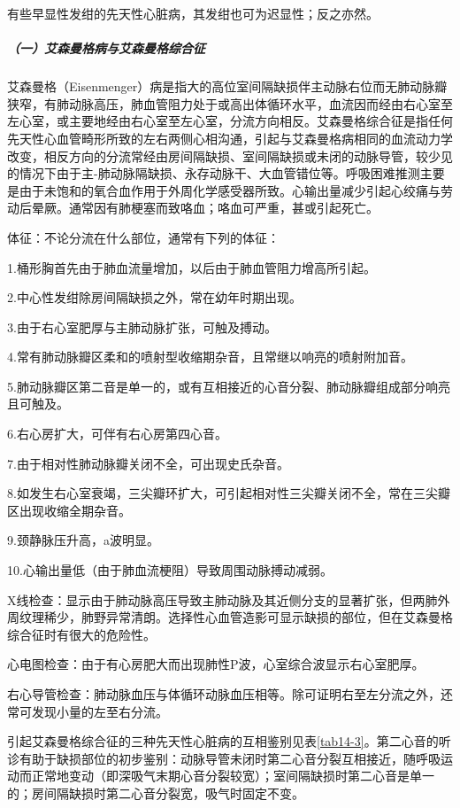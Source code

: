 有些早显性发绀的先天性心脏病，其发绀也可为迟显性；反之亦然。

\subparagraph{（一）艾森曼格病与艾森曼格综合征}

艾森曼格（Eisenmenger）病是指大的高位室间隔缺损伴主动脉右位而无肺动脉瓣狭窄，有肺动脉高压，肺血管阻力处于或高出体循环水平，血流因而经由右心室至左心室，或主要地经由右心室至左心室，分流方向相反。艾森曼格综合征是指任何先天性心血管畸形所致的左右两侧心相沟通，引起与艾森曼格病相同的血流动力学改变，相反方向的分流常经由房间隔缺损、室间隔缺损或未闭的动脉导管，较少见的情况下由于主-肺动脉隔缺损、永存动脉干、大血管错位等。呼吸困难推测主要是由于未饱和的氧合血作用于外周化学感受器所致。心输出量减少引起心绞痛与劳动后晕厥。通常因有肺梗塞而致咯血；咯血可严重，甚或引起死亡。

体征：不论分流在什么部位，通常有下列的体征：

1.桶形胸首先由于肺血流量增加，以后由于肺血管阻力增高所引起。

2.中心性发绀除房间隔缺损之外，常在幼年时期出现。

3.由于右心室肥厚与主肺动脉扩张，可触及搏动。

4.常有肺动脉瓣区柔和的喷射型收缩期杂音，且常继以响亮的喷射附加音。

5.肺动脉瓣区第二音是单一的，或有互相接近的心音分裂、肺动脉瓣组成部分响亮且可触及。

6.右心房扩大，可伴有右心房第四心音。

7.由于相对性肺动脉瓣关闭不全，可出现史氏杂音。

8.如发生右心室衰竭，三尖瓣环扩大，可引起相对性三尖瓣关闭不全，常在三尖瓣区出现收缩全期杂音。

9.颈静脉压升高，a波明显。

10.心输出量低（由于肺血流梗阻）导致周围动脉搏动减弱。

X线检查：显示由于肺动脉高压导致主肺动脉及其近侧分支的显著扩张，但两肺外周纹理稀少，肺野异常清朗。选择性心血管造影可显示缺损的部位，但在艾森曼格综合征时有很大的危险性。

心电图检查：由于有心房肥大而出现肺性P波，心室综合波显示右心室肥厚。

右心导管检查：肺动脉血压与体循环动脉血压相等。除可证明右至左分流之外，还常可发现小量的左至右分流。

引起艾森曼格综合征的三种先天性心脏病的互相鉴别见表\ref{tab14-3}。第二心音的听诊有助于缺损部位的初步鉴别：动脉导管未闭时第二心音分裂互相接近，随呼吸运动而正常地变动（即深吸气末期心音分裂较宽）；室间隔缺损时第二心音是单一的；房间隔缺损时第二心音分裂宽，吸气时固定不变。

